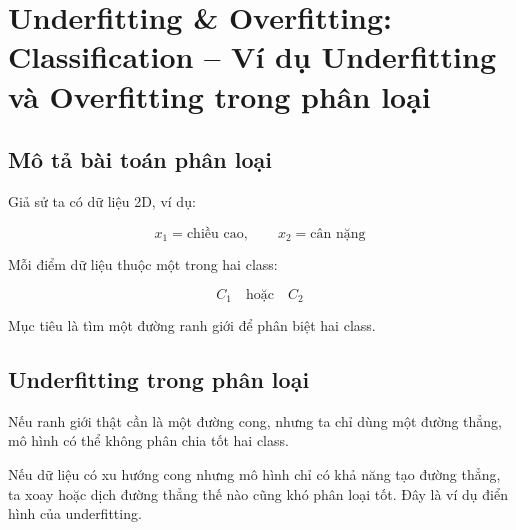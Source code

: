 \section{Underfitting \& Overfitting: Classification -- Ví dụ Underfitting và Overfitting trong phân loại}

\subsection{Mô tả bài toán phân loại}

Giả sử ta có dữ liệu 2D, ví dụ:

\[
    x_1 = \text{chiều cao}, \qquad x_2 = \text{cân nặng}
\]

Mỗi điểm dữ liệu thuộc một trong hai class:

\[
    C_1 \quad \text{hoặc} \quad C_2
\]

Mục tiêu là tìm một đường ranh giới để phân biệt hai class.

\subsection{Underfitting trong phân loại}

Nếu ranh giới thật cần là một đường cong, nhưng ta chỉ dùng một đường thẳng, mô hình có thể không phân chia tốt hai class.

\begin{center}
\end{center}

\begin{vidu}
Nếu dữ liệu có xu hướng cong nhưng mô hình chỉ có khả năng tạo đường thẳng, ta xoay hoặc dịch đường thẳng thế nào cũng khó phân loại tốt. Đây là ví dụ điển hình của underfitting.
\end{vidu}

